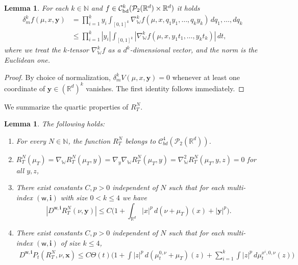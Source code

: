 \documentclass[11pt,reqno]{amsart}
\numberwithin{equation}{section}
\newtheorem{lemma}[theorem]{Lemma}
\theoremstyle{definition}
\def\R{{\mathbb R}}
\def\N{{\mathbb N}}
\newcommand{\wgrad}{\nabla_{\W}}
\newcommand{\W}{\mathbb W}
\begin{document}
\begin{lemma}
    \label{lm: first derivatives are subpolynomial}
    For each $k \in \N$ and $f \in \mathcal C_{\textup{bd}}^k(\mathcal P_2(\R^d)\times \R^d)$ it holds 
    \begin{align*}
        \delta_m^k f(\mu,x,\boldsymbol{y})&= \prod_{i=1}^k y_i \int_{[0,1]^k} \wgrad^k f(\mu,x,q_1 y_1,\dots,q_k y_k)\,dq_1,\dots,d q_k  \\
        &\leq  \prod_{i=1}^k |y_i|\int_{[0,1]^k}|\wgrad^k f(\mu,x,y_1t_1,\dots,y_kt_k)|\,dt,
    \end{align*}
    where we treat the $k$-tensor $\wgrad^k f$ as a $d^k$-dimensional vector, and the norm is the Euclidean one.\end{lemma}
\begin{proof}
    By choice of normalization, $\delta_m^k  V (\mu,x,\boldsymbol{y})=0$ whenever at least one coordinate of $\boldsymbol{y} \in (\R^d)^k$ vanishes. The first identity follows immediately.
\end{proof}
We summarize the quartic properties of $R_T^N$.
\begin{lemma}
\label{lm: estimates on remainder}
    The following holds:
    \begin{enumerate}
    \item For every $N\in \N$, the function $R_T^N$ belongs to $\mathcal C^4_{bd}(\mathcal P_2(\R^d))$.
    \item $R_T^N(\mu_T)=\wgrad R_T^N(\mu_T,y)=\nabla_y \wgrad R_T^N(\mu_T,y)=\wgrad^2 R_T^N(\mu_T,y,z)=0$ for all $y,z$,
    \item There exist constants $C,p>0$ independent of $N$ such that for each multi-index $(\mathsf w,\boldsymbol{i})$ with size $0<k\leq 4$ we have
    \[|D^{\mathsf w,\boldsymbol{i}} R_T^N(\nu,\boldsymbol{y})|\leq C\bigg(1+\int_{\R^d}|x|^p \,d(\nu+\mu_T)(x)+|\boldsymbol{y}|^p\bigg).\]
    \item There exist constants $C,p>0$ independent of $N$ such that for each multi-index $(\mathsf w, \boldsymbol i)$ of size $k\leq 4$,
    \begin{align*}
         D^{\mathsf w,\boldsymbol{i}}P_t(R_T^N,\nu,\boldsymbol x)\leq C\Theta(t)\bigg(1+\int|z|^p \,d(\mu_t^{0,\nu}+\mu_T)(z)+\sum_{i=1}^k \int|z|^p\,d\mu_t^{x^i,0,\nu}(z)\bigg)
    \end{align*}
    \end{enumerate}
\end{lemma}
\end{document}
